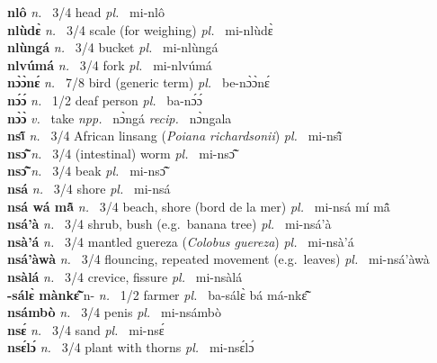 {\bfseries nlô}  {\itshape n.~} 3/4 head {\itshape pl.~} mi-nlô    \\ 
{\bfseries nlùdɛ̀}  {\itshape n.~} 3/4 scale (for weighing) {\itshape pl.~} mi-nlùdɛ̀    \\ 
{\bfseries nlùngá}  {\itshape n.~} 3/4 bucket {\itshape pl.~} mi-nlùngá    \\ 
{\bfseries nlvúmá}  {\itshape n.~} 3/4 fork {\itshape pl.~} mi-nlvúmá    \\ 
{\bfseries nɔ̀ɔ̀nɛ́}  {\itshape n.~} 7/8 bird (generic term) {\itshape pl.~} be-nɔ̀ɔ̀nɛ́    \\ 
{\bfseries nɔ́ɔ́}  {\itshape n.~} 1/2 deaf person {\itshape pl.~} ba-nɔ́ɔ́    \\ 
{\bfseries nɔ̀ɔ̀}  {\itshape v.~} take   {\itshape npp.~} nɔ̀ngá {\itshape recip.~} nɔ̀ngala  \\ 
{\bfseries nsĩ̂}  {\itshape n.~} 3/4 African linsang ({\itshape Poiana richardsonii}) {\itshape pl.~} mi-nsĩ̂    \\ 
{\bfseries nsɔ̃̂}  {\itshape n.~} 3/4 (intestinal) worm {\itshape pl.~} mi-nsɔ̃̂    \\ 
{\bfseries nsɔ̃̂}  {\itshape n.~} 3/4 beak {\itshape pl.~} mi-nsɔ̃̂    \\ 
{\bfseries nsá}  {\itshape n.~} 3/4 shore {\itshape pl.~} mi-nsá    \\ 
{\bfseries nsá wá mã̂}  {\itshape n.~} 3/4 beach, shore (bord de la mer) {\itshape pl.~} mi-nsá mí mã̂    \\ 
{\bfseries nsá'à}  {\itshape n.~} 3/4 shrub, bush (e.g.\ banana tree) {\itshape pl.~} mi-nsá'à    \\ 
{\bfseries nsà'á}  {\itshape n.~} 3/4 mantled guereza ({\itshape Colobus guereza})  {\itshape pl.~} mi-nsà'á    \\ 
{\bfseries nsá'àwà}  {\itshape n.~} 3/4 flouncing, repeated movement (e.g.\ leaves) {\itshape pl.~} mi-nsá'àwà    \\ 
{\bfseries nsàlá}  {\itshape n.~} 3/4 crevice, fissure {\itshape pl.~} mi-nsàlá    \\ 
{\bfseries -sálɛ̀ mànkɛ̃̂} n- {\itshape n.~} 1/2 farmer {\itshape pl.~} ba-sálɛ̀ bá má-nkɛ̃̂    \\ 
{\bfseries nsámbò}  {\itshape n.~} 3/4 penis {\itshape pl.~} mi-nsámbò    \\ 
{\bfseries nsɛ́}  {\itshape n.~} 3/4 sand {\itshape pl.~} mi-nsɛ́    \\ 
{\bfseries nsɛ́lɔ́}  {\itshape n.~} 3/4 plant with thorns {\itshape pl.~} mi-nsɛ́lɔ́    \\ 

